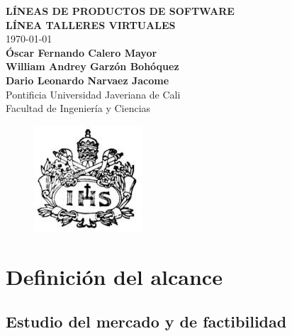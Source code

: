 \documentclass[10pt,a4paper,openany]{book}
\begin{document}
\begin{titlepage}
	\begin{center}
		{\Large \textbf{LÍNEAS DE PRODUCTOS DE SOFTWARE}}\\
		\vspace{3cm}
		{\Large \textbf{LÍNEA TALLERES VIRTUALES}}\\
		\vspace{3cm}
		{\large \today}\\
		\vspace{3cm}
		{\large \textbf{Óscar Fernando Calero Mayor}}\\
		{\large \textbf{William Andrey Garzón Bohóquez}}\\
		{\large \textbf{Dario Leonardo Narvaez Jacome}}\\
		\vspace{1cm}
		{\large Pontificia Universidad Javeriana de Cali}\\
		{\large Facultad de Ingeniería y Ciencias}\\
		\begin{figure}[h]
			\centering
			\includegraphics[scale=0.8]{logo}
		\end{figure}
	\end{center} 
\end{titlepage}

\tableofcontents

\chapter{Definición del alcance}
\section{Estudio del mercado y de factibilidad}
\end{document}

